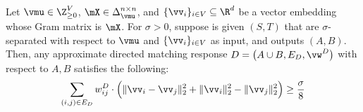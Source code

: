 \documentclass[letterpaper]{article}
\begin{document}
\begin{lemma}
\label{lem.asym-cut-strat.loss}
Let $\vmu \in \Z_{\geq 0}^V$, $\mX \in \Delta_{\vmu}^{n \times n}$, and $\{ \vv_i \}_{i \in V} \subseteq \R^d$ be a vector embedding whose Gram matrix is $\mX$. For $\sigma > 0$, suppose \dirroundcut is given $(S, T)$ that are $\sigma$-separated with respect to $\vmu$ and $\{ \vv_i \}_{i \in V}$ as input, and outputs $(A, B)$. Then, any approximate directed matching response $D = \big( A \cup B, E_D, \vw^D \big)$ with respect to $A, B$ satisfies the following:
\begin{equation*}
\sum_{(i, j) \in E_D} w_{ij}^D \cdot \Big( \lVert \vv_i - \vv_j \rVert_2^2 + \lVert \vv_i \rVert_2^2 - \lVert \vv_j \rVert_2^2 \Big)
\geq \frac{\sigma}{8}
\end{equation*}
\end{lemma}
\end{document}
